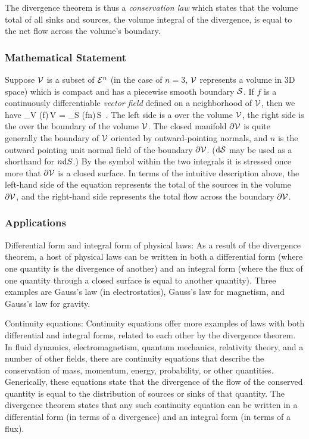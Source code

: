 The divergence theorem is thus a \emph{conservation law} which states that the volume total of all sinks and sources, the volume integral of the divergence, is equal to the net flow across the volume's boundary.


\subsubsection{Mathematical Statement}
Suppose $\mathcal{V}$ is a subset of $\mathcal{E}^{n}$ (in the case of $n = 3$, $\mathcal{V}$ represents a volume in 3D space) which is compact and has a piecewise smooth boundary $\mathcal{S}$. If $f$ is a continuously differentiable \emph{vector field} defined on a neighborhood of $\mathcal{V}$, then we have
\beq
\int_{\region V} (\gder\iprod f)\,\dx\region V = \oint_{\surf S} (f\iprod n)\,\dx\surf S \,.
\eeq
The left side is a  over the volume $\mathcal{V}$, the right side is the  over the boundary of the volume $\mathcal{V}$. The closed manifold $\partial{\mathcal{V}}$ is quite generally the boundary of $\mathcal{V}$ oriented by outward-pointing normals, and $n$ is the outward pointing unit normal field of the boundary $\partial\mathcal{V}$. ($\text{d}\mathcal{S}$ may be used as a shorthand for $n\text{d} S$.) By the symbol within the two integrals it is stressed once more that $\partial\mathcal{V}$ is a closed surface. In terms of the intuitive description above, the left-hand side of the equation represents the total of the sources in the volume $\partial\mathcal{V}$, and the right-hand side represents the total flow across the boundary $\partial\mathcal{V}$.


\subsubsection{Applications}
Differential form and integral form of physical laws: As a result of the divergence theorem, a host of physical laws can be written in both a differential form (where one quantity is the divergence of another) and an integral form (where the flux of one quantity through a closed surface is equal to another quantity). Three examples are Gauss's law (in electrostatics), Gauss's law for magnetism, and Gauss's law for gravity.

Continuity equations: Continuity equations offer more examples of laws with both differential and integral forms, related to each other by the divergence theorem. In fluid dynamics, electromagnetism, quantum mechanics, relativity theory, and a number of other fields, there are continuity equations that describe the conservation of mass, momentum, energy, probability, or other quantities. Generically, these equations state that the divergence of the flow of the conserved quantity is equal to the distribution of sources or sinks of that quantity. The divergence theorem states that any such continuity equation can be written in a differential form (in terms of a divergence) and an integral form (in terms of a flux).


